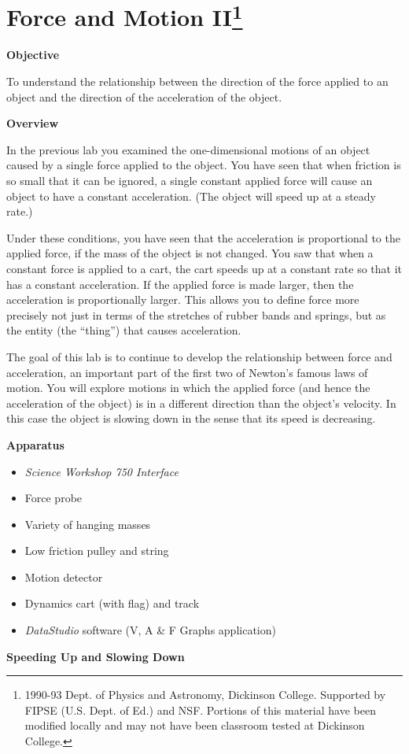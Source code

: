
\section{Force and Motion II\footnote{
1990-93 Dept. of Physics and Astronomy, Dickinson College. Supported by FIPSE
(U.S. Dept. of Ed.) and NSF. Portions of this material have been modified locally
and may not have been classroom tested at Dickinson College.
}}

\makelabheader %

\textbf{Objective} 

To understand the relationship between the direction of the force applied to
an object and the direction of the acceleration of the object. 

\textbf{Overview} 

In the previous lab you examined the one-dimensional motions of an object caused
by a single force applied to the object. You have seen that when friction is
so small that it can be ignored, a single constant applied force will cause
an object to have a constant acceleration. (The object will speed up at a steady
rate.) 

Under these conditions, you have seen that the acceleration is proportional
to the applied force, if the mass of the object is not changed. You saw that
when a constant force is applied to a cart, the cart speeds up at a constant
rate so that it has a constant acceleration. If the applied force is made larger,
then the acceleration is proportionally larger. This allows you to define force
more precisely not just in terms of the stretches of rubber bands and springs,
but as the entity (the ``thing'') that causes acceleration.

The goal of this lab is to continue to develop the relationship between force
and acceleration, an important part of the first two of Newton's famous laws
of motion. You will explore motions in which the applied force (and hence the
acceleration of the object) is in a different direction than the object's velocity.
In this case the object is slowing down in the sense that its speed is decreasing.

\textbf{Apparatus }

\begin{itemize}
\item \textit{Science Workshop 750 Interface}
\item Force probe 
\item Variety of hanging masses 
\item Low friction pulley and string 
\item Motion detector 
\item Dynamics cart (with flag) and track 
\item \textit{DataStudio} software (V, A \& F Graphs application)
\end{itemize}
\textbf{Speeding Up and Slowing Down }

